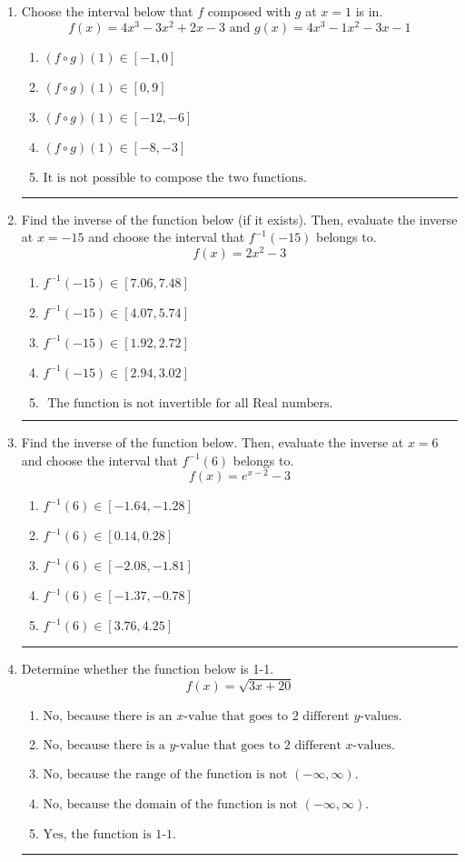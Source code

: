 \documentclass[14pt]{extbook}
\newcommand{\litem}[1]{\item#1\hspace*{-1cm}\rule{\textwidth}{0.4pt}}
\begin{document}
\begin{enumerate}
{\begin{enumerate}[label=\Alph*.]
\end{enumerate} }
\litem{
Choose the interval below that $f$ composed with $g$ at $x=1$ is in.\[ f(x) = 4x^{3} -3 x^{2} +2 x -3 \text{ and } g(x) = 4x^{3} -1 x^{2} -3 x -1 \]\begin{enumerate}[label=\Alph*.]
\item \( (f \circ g)(1) \in [-1, 0] \)
\item \( (f \circ g)(1) \in [0, 9] \)
\item \( (f \circ g)(1) \in [-12, -6] \)
\item \( (f \circ g)(1) \in [-8, -3] \)
\item \( \text{It is not possible to compose the two functions.} \)

\end{enumerate} }
\litem{
Find the inverse of the function below (if it exists). Then, evaluate the inverse at $x = -15$ and choose the interval that $f^{-1}(-15)$ belongs to.\[ f(x) = 2 x^2 - 3 \]\begin{enumerate}[label=\Alph*.]
\item \( f^{-1}(-15) \in [7.06, 7.48] \)
\item \( f^{-1}(-15) \in [4.07, 5.74] \)
\item \( f^{-1}(-15) \in [1.92, 2.72] \)
\item \( f^{-1}(-15) \in [2.94, 3.02] \)
\item \( \text{ The function is not invertible for all Real numbers. } \)

\end{enumerate} }
\litem{
Find the inverse of the function below. Then, evaluate the inverse at $x = 6$ and choose the interval that $f^{-1}(6)$ belongs to.\[ f(x) = e^{x-2}-3 \]\begin{enumerate}[label=\Alph*.]
\item \( f^{-1}(6) \in [-1.64, -1.28] \)
\item \( f^{-1}(6) \in [0.14, 0.28] \)
\item \( f^{-1}(6) \in [-2.08, -1.81] \)
\item \( f^{-1}(6) \in [-1.37, -0.78] \)
\item \( f^{-1}(6) \in [3.76, 4.25] \)

\end{enumerate} }
\litem{
Determine whether the function below is 1-1.\[ f(x) = \sqrt{3 x + 20} \]\begin{enumerate}[label=\Alph*.]
\item \( \text{No, because there is an $x$-value that goes to 2 different $y$-values.} \)
\item \( \text{No, because there is a $y$-value that goes to 2 different $x$-values.} \)
\item \( \text{No, because the range of the function is not $(-\infty, \infty)$.} \)
\item \( \text{No, because the domain of the function is not $(-\infty, \infty)$.} \)
\item \( \text{Yes, the function is 1-1.} \)

\end{enumerate} }
\end{enumerate}
\end{document}
